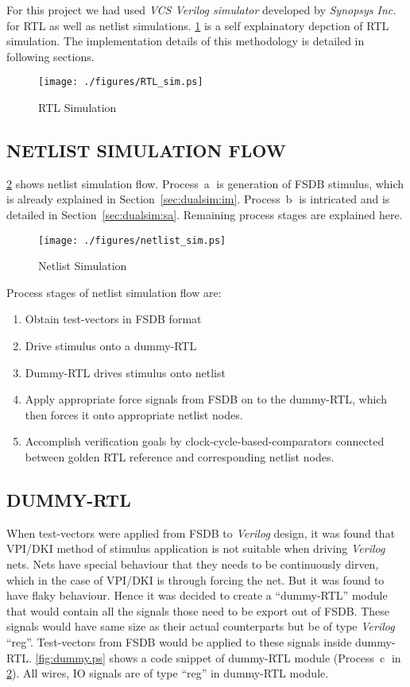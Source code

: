 For this project we had used {\it VCS Verilog simulator} developed by {\it Synopsys Inc.} for RTL as well as netlist simulations. \figurename{\ref{fig:RTL_sim.eps}} is a self explainatory depction of RTL simulation. The implementation details of this methodology is detailed in following sections. 

\begin{figure}[h]
\centering
\texttt{[image: ./figures/RTL\_sim.ps]}
\caption{RTL Simulation}
\label{fig:RTL_sim.eps}
\end{figure}


\subsection{NETLIST SIMULATION FLOW}
\figurename{\ref{fig:netlist_sim.ps}} shows netlist simulation flow. Process~\textcircled{a} is generation of FSDB stimulus, which is already explained in Section~\ref{sec:dualsim:im}. Process~\textcircled{b} is intricated and is detailed in Section~\ref{sec:dualsim:sa}. Remaining process stages are explained here.

\begin{figure}[h]
\centering
\texttt{[image: ./figures/netlist\_sim.ps]}
\caption{Netlist Simulation}
\label{fig:netlist_sim.ps}
\end{figure}

Process stages of netlist simulation flow are:
\begin{enumerate}
	\item Obtain test-vectors in FSDB format
	\item Drive stimulus onto a dummy-RTL
	\item Dummy-RTL drives stimulus onto netlist
	\item Apply appropriate force signals from FSDB on to the dummy-RTL, which then forces it onto appropriate netlist nodes.
	\item Accomplish verification goals by clock-cycle-based-comparators connected between golden RTL reference and corresponding netlist nodes.
\end{enumerate}

\subsection{DUMMY-RTL}
When test-vectors were applied from FSDB to {\it Verilog} design, it was found that VPI/DKI method of stimulus application is not suitable when driving {\it Verilog} nets. Nets have special behaviour that they needs to be continuously dirven, which in the case of VPI/DKI is through forcing the net. But it was found to have flaky behaviour. Hence it was decided to create a ``dummy-RTL'' module that would contain all the signals those need to be export out of FSDB. These signals would have same size as their actual counterparts but be of type {\it Verilog} ``reg''. Test-vectors from FSDB would be applied to these signals inside dummy-RTL. \figurename{\ref{fig:dummy.ps}} shows a code snippet of dummy-RTL module (Process~\textcircled{c} in \figurename{\ref{fig:netlist_sim.ps}}). All wires, IO signals are of type ``reg'' in dummy-RTL module.


